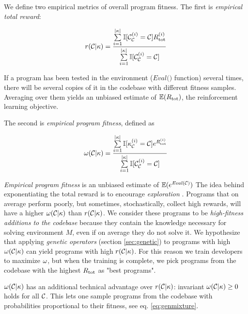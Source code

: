 We define two empirical metrics of overall program fitness.
The first is \emph{empirical total reward}:

\begin{equation}
    r(\mathcal{C}|\kappa) = \frac{\sum\limits_{i=1}^{|\kappa|} \mathbb{I} [\mathcal{C}_{\mathcal{C}}^{(i)}=\mathcal{C}] R_\text{tot}^{(i)}}{\sum\limits_{i=1}^{|\kappa|} \mathbb{I} [\mathcal{C}_{\mathcal{C}}^{(i)}=\mathcal{C}]}
\end{equation}

If a program has been tested in the environment ($\textit{Eval()}$ function) several times, there will be several copies of it in the codebase with different fitness samples.
Averaging over them yields an unbiased estimate of $\mathbb{E}(R_\text{tot})$, the reinforcement learning objective.

The second is \emph{empirical program fitness}, defined as

\begin{equation}
    \omega(\mathcal{C}|\kappa) = \frac{\sum\limits_{i=1}^{|\kappa|} \mathbb{I} [\kappa_{\mathcal{C}}^{(i)}=\mathcal{C}] e^{R_\text{tot}^{(i)}}}{\sum\limits_{i=1}^{|\kappa|} \mathbb{I} [\mathcal{C}_{\mathcal{C}}^{(i)}=\mathcal{C}]}
    \label{eq:empfitness}
\end{equation}

\emph{Empirical program fitness} is an unbiased estimate of $\mathbb{E}(e^{\mathit{Eval}(\mathcal{C})})$
The idea behind exponentiating the total reward is to encourage \emph{exploration} \cite{ruckstiessExploringParameterSpace2010}.
Programs that on average perform poorly, but sometimes, stochastically, collect high rewards, will have a higher $\omega(\mathcal{C}|\kappa)$ than $r(\mathcal{C}|\kappa)$.
We consider these programs to be \emph{high-fitness additions to the codebase} because they contain the knowledge necessary for solving environment $M$, even if on average they do not solve it.
We hypothesize that applying \emph{genetic operators} (section \ref{sec:genetic}) to programs with high $\omega(\mathcal{C}|\kappa)$ can yield programs with high $r(\mathcal{C}|\kappa)$.
For this reason we train developers to maximize $\omega$, but when the training is complete, we pick programs from the codebase with the highest $R_\text{tot}$ as "best programs".
 
$\omega(\mathcal{C}|\kappa)$ has an additional technical advantage over $r(\mathcal{C}|\kappa)$: invariant $\omega(\mathcal{C}|\kappa) \geq 0$ holds for all $\mathcal{C}$.
This lets one sample programs from the codebase with probabilities proportional to their fitness, see eq. \ref{eq:genmixture}.

